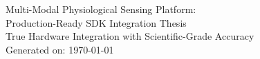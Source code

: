 \documentclass[11pt]{report}
\begin{document}
    \begin{titlepage}
        \centering
        {\LARGE Multi-Modal Physiological Sensing Platform:\\[0.5ex]}
        {\LARGE Production-Ready SDK Integration Thesis\\[1ex]}
        {\large True Hardware Integration with Scientific-Grade Accuracy}\\[1ex]
        {\large Generated on: \today}
    \end{titlepage}

    \tableofcontents
    \clearpage

    
    
    
    
    
    
    \clearpage
    \renewcommand{\bibname}{References}
    
    

    \appendix
    \clearpage
    
    
    
    
    
    
    
    
    
\end{document}
